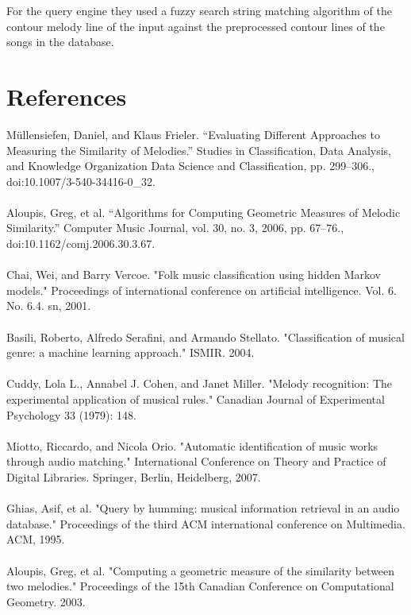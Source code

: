 \documentclass{article}
\begin{document}
	For the query engine they used a fuzzy search string matching algorithm of the contour melody line of the input against the preprocessed contour lines of the songs in the database. 
	
	\section{References}
 	Müllensiefen, Daniel, and Klaus Frieler. “Evaluating Different Approaches to Measuring the Similarity of Melodies.” Studies in Classification, Data Analysis, and Knowledge Organization Data Science and Classification, pp. 299–306., doi:10.1007/3-540-34416-0\_32.
	\\ \\
	Aloupis, Greg, et al. “Algorithms for Computing Geometric Measures of Melodic Similarity.” Computer Music Journal, vol. 30, no. 3, 2006, pp. 67–76., \\doi:10.1162/comj.2006.30.3.67.
	\\ \\
	Chai, Wei, and Barry Vercoe. "Folk music classification using hidden Markov models." Proceedings of international conference on artificial intelligence. Vol. 6. No. 6.4. sn, 2001.
	\\ \\
	Basili, Roberto, Alfredo Serafini, and Armando Stellato. "Classification of musical genre: a machine learning approach." ISMIR. 2004.
	\\ \\
	Cuddy, Lola L., Annabel J. Cohen, and Janet Miller. "Melody recognition: The experimental application of musical rules." Canadian Journal of Experimental Psychology 33 (1979): 148.
	\\ \\
	Miotto, Riccardo, and Nicola Orio. "Automatic identification of music works through audio matching." International Conference on Theory and Practice of Digital Libraries. Springer, Berlin, Heidelberg, 2007.
	\\ \\
	Ghias, Asif, et al. "Query by humming: musical information retrieval in an audio database." Proceedings of the third ACM international conference on Multimedia. ACM, 1995.
	\\ \\
	Aloupis, Greg, et al. "Computing a geometric measure of the similarity between two melodies." Proceedings of the 15th Canadian Conference on Computational Geometry. 2003.
	\\
\end{document}

